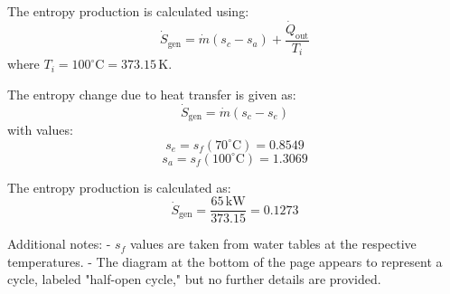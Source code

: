 The entropy production is calculated using:  
\[
\dot{S}_{\text{gen}} = \dot{m}(s_c - s_a) + \frac{\dot{Q}_{\text{out}}}{T_i}
\]  
where \( T_i = 100^\circ\text{C} = 373.15 \, \text{K} \).  

The entropy change due to heat transfer is given as:  
\[
\dot{S}_{\text{gen}} = \dot{m}(s_c - s_e)
\]  
with values:  
\[
s_e = s_f(70^\circ\text{C}) = 0.8549
\]  
\[
s_a = s_f(100^\circ\text{C}) = 1.3069
\]  

The entropy production is calculated as:  
\[
\dot{S}_{\text{gen}} = \frac{65 \, \text{kW}}{373.15} = 0.1273
\]  

Additional notes:  
- \( s_f \) values are taken from water tables at the respective temperatures.  
- The diagram at the bottom of the page appears to represent a cycle, labeled "half-open cycle," but no further details are provided.